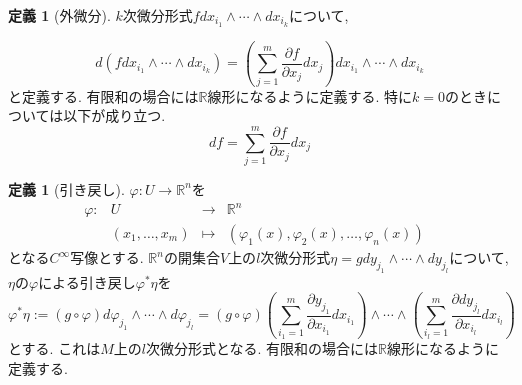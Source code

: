 \documentclass[dvipdfmx,a4paper,11pt]{article}
\newcommand{\R}{\mathbb{R}}
\theoremstyle{definition}
\newtheorem{dfn}[thm]{定義}
\newcommand{\pdrv}[2]{\frac{\partial #1}{\partial #2}}
\begin{document}
  \begin{tcolorbox}[
    colback = white,
    colframe = green!35!black,
    fonttitle = \bfseries,
    breakable = true]
\begin{dfn}[外微分]
$k$次微分形式$f d x_{i_1}\wedge \cdots \wedge dx_{i_k}$について, 

$$
d \left(  f d x_{i_1}\wedge \cdots \wedge dx_{i_k} \right)
= \left(\sum_{j=1}^{m}\pdrv{f}{x_{j}}d x_{j}\right)  d x_{i_1}\wedge \cdots \wedge dx_{i_k}
$$
と定義する. 有限和の場合には$\R$線形になるように定義する. 特に$k=0$のときについては以下が成り立つ. 
$$
df =  \sum_{j=1}^{m}\pdrv{f}{x_{j}}d x_{j}
$$
    \end{dfn}
    \end{tcolorbox}
      \begin{tcolorbox}[
    colback = white,
    colframe = green!35!black,
    fonttitle = \bfseries,
    breakable = true]
\begin{dfn}[引き戻し]


 $\varphi : U \rightarrow \R^n$を
 $$
 \begin{array}{ccccc}
\varphi: &U& \rightarrow & \R^n& \\
&(x_{1}, \ldots, x_m) & \longmapsto & 
(\varphi_1 (x) , \varphi_2 (x) , \ldots, \varphi_n (x)) &
\end{array}
$$
 となる$C^{\infty}$写像とする.
 $\R^n$の開集合$V$上の$l$次微分形式$\eta = g d y_{j_1} \wedge \cdots \wedge dy_{j_l}$について, $\eta$の$\varphi$による引き戻し$\varphi^{*}\eta$を
 $$
\varphi^{*}\eta:= 
(g\circ \varphi )d \varphi_{j_1} \wedge \cdots \wedge d \varphi_{j_l} 
=
(g\circ \varphi )
\left(\sum_{i_1 =1}^{m}\pdrv{ y_{j_1}}{x_{i_1}} dx_{i_1} \right)\wedge \cdots \wedge 
\left(\sum_{i_l =1}^{m}\pdrv{dy_{j_l}}{x_{i_l}} dx_{i_l}\right)
$$
とする. これは$M$上の$l$次微分形式となる. 有限和の場合には$\R$線形になるように定義する. 

    \end{dfn}
    \end{tcolorbox}
 
\end{document}
